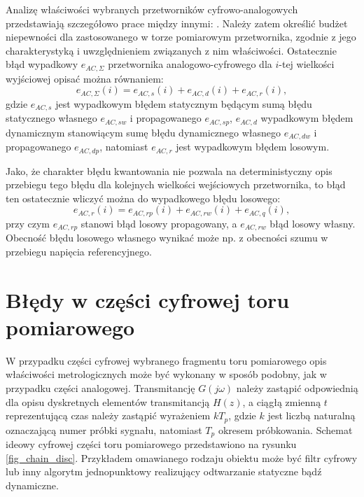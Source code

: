 Analizę właściwości wybranych przetworników cyfrowo-analogowych przedstawiają szczegółowo prace między innymi: \cite{jakubiec_system, sienkowski_adc, sienkowski_kwant, arpaia_deltasigma}. Należy zatem określić budżet niepewności dla zastosowanego w torze pomiarowym przetwornika, zgodnie z jego charakterystyką i uwzględnieniem związanych z nim właściwości. Ostatecznie błąd wypadkowy $e_{AC,\Sigma}$ przetwornika analogowo-cyfrowego dla $i$-tej wielkości wyjściowej opisać można równaniem:
\begin{equation}
e_{AC,\Sigma} \left( i \right) = e_{AC,s} \left( i \right) + e_{AC,d} \left( i \right) + e_{AC,r} \left( i \right) \label{eqn_adc_outerr},
\end{equation}
gdzie $e_{AC,s}$ jest wypadkowym błędem statycznym będącym sumą błędu statycznego własnego $e_{AC,sw}$ i propagowanego $e_{AC,sp}$, $e_{AC,d}$ wypadkowym błędem dynamicznym stanowiącym sumę błędu dynamicznego własnego $e_{AC,dw}$ i propagowanego $e_{AC,dp}$, natomiast $e_{AC,r}$ jest wypadkowym błędem losowym.

Jako, że charakter błędu kwantowania nie pozwala na deterministyczny opis przebiegu tego błędu dla kolejnych wielkości wejściowych przetwornika, to błąd ten ostatecznie wliczyć można do wypadkowego błędu losowego:
\begin{equation}
e_{AC,r} \left( i \right) = e_{AC,rp} \left( i \right) + e_{AC,rw} \left( i \right) + e_{AC,q} \left( i \right) \label{eqn_adc_rerr},
\end{equation}
przy czym $e_{AC,rp}$ stanowi błąd losowy propagowany, a $e_{AC,rw}$ błąd losowy własny. Obecność błędu losowego własnego wynikać może np. z obecności szumu w przebiegu napięcia referencyjnego.

\section{Błędy w części cyfrowej toru pomiarowego}

W przypadku części cyfrowej wybranego fragmentu toru pomiarowego opis właściwości metrologicznych może być wykonany w sposób podobny, jak w przypadku części analogowej. Transmitancję $G(j\omega)$ należy zastąpić odpowiednią dla opisu dyskretnych elementów transmitancją $H(z)$, a ciągłą zmienną $t$ reprezentującą czas należy zastąpić wyrażeniem $kT_{p}$, gdzie $k$ jest liczbą naturalną oznaczającą numer próbki sygnału, natomiast $T_{p}$ okresem próbkowania. Schemat ideowy cyfrowej części toru pomiarowego przedstawiono na rysunku \ref{fig_chain_disc}. Przykładem omawianego rodzaju obiektu może być filtr cyfrowy lub inny algorytm jednopunktowy realizujący odtwarzanie statyczne bądź dynamiczne.

